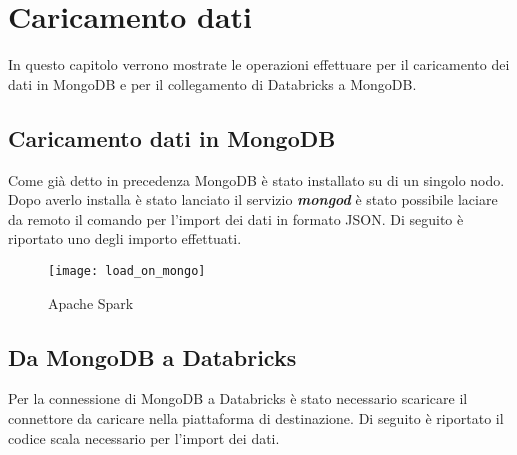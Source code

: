 
\chapter{Caricamento dati}
In questo capitolo verrono mostrate le operazioni effettuare per il caricamento
dei dati in MongoDB e per il collegamento di Databricks a MongoDB.

\section{Caricamento dati in MongoDB}
Come già detto in precedenza MongoDB è stato installato su di un singolo nodo.
Dopo averlo installa è stato lanciato il servizio \textbf{\textit{mongod}} è stato
possibile laciare da remoto il comando per l'import dei dati in formato JSON.
Di seguito è riportato uno degli importo effettuati.

\begin{figure}[!htbp]
	\texttt{[image: load\_on\_mongo]}
  \caption{Apache Spark}
  \label{}
\end{figure}


\section{Da MongoDB a Databricks}

Per la connessione di MongoDB a Databricks è stato necessario scaricare il connettore
da caricare nella piattaforma di destinazione. Di seguito è riportato il codice
scala necessario per l'import dei dati.

